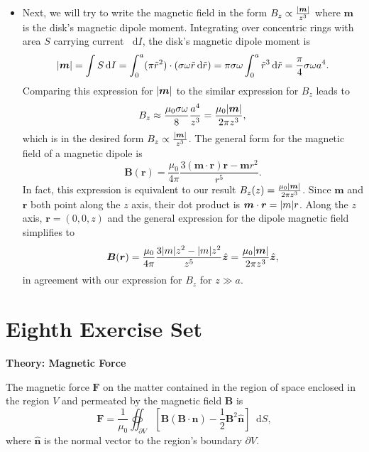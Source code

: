 \documentclass[11pt, a4paper]{article}
\newcommand{\diff}{\mathop{}\!\mathrm{d}} %
\renewcommand{\vec}[1]{\bm{#1}} %
\newcommand{\uvec}[1]{\hat{\vec{#1}}} %
\renewcommand{\t}[1]{\tilde{#1}} %
\renewcommand{\r}{\vec{r}}
\newcommand{\B}{\vec{B}}  %
\newcommand{\m}{\vec{m}}  %
\begin{document}
\begin{itemize}
	\item Next, we will try to write the magnetic field in the form $ B_{z} \propto \frac{\abs{\m}}{z^{3}} $ where $ \m $ is the disk's magnetic dipole moment. Integrating over concentric rings with area $ S $ carrying current $ \diff I $, the disk's magnetic dipole moment is
	\begin{equation*}
		\abs{\m} = \int S \diff I = \int_{0}^{a} (\pi \t{r}^{2}) \cdot (\sigma \omega \t{r}\diff \t{r}) = \pi \sigma \omega \int_{0}^{a} \t{r}^{3} \diff \t{r} = \frac{\pi}{4}\sigma \omega a^{4}.
	\end{equation*}
	Comparing this expression for $ \abs{\m} $ to the similar expression for $ B_{z} $ leads to 
	\begin{equation*}
		B_{z} \approx  \frac{\mu_{0}\sigma \omega}{8} \frac{a^{4}}{z^{3}} = \frac{\mu_{0}\abs{\m}}{2\pi z^{3}},
	\end{equation*}	
	which is in the desired form $  B_{z} \propto \frac{\abs{\m}}{z^{3}} $. The general form for the magnetic field of a magnetic dipole is
	\begin{equation*}
		\B(\r) = \frac{\mu_{0}}{4\pi}\frac{3(\m \cdot \r)\r - \m r^{2}}{r^{5}}.
	\end{equation*}
	In fact, this expression is equivalent to our result $ B_{z}(z) = \frac{\mu_{0}\abs{\m}}{2\pi z^{3}} $. Since $ \m $ and $ \r $ both point along the $ z $ axis, their dot product is $ \m \cdot \r = \abs{m}r $. Along the $ z $ axis, $ \r = (0, 0, z) $ and the general expression for the dipole magnetic field simplifies to
	\begin{equation*}
		\B(\r) = \frac{\mu_{0}}{4\pi} \frac{3\abs{m}z^{2} - \abs{m}z^{2}}{z^{5}}\uvec{z} = \frac{\mu_{0}\abs{\m}}{2\pi z^{3}} \uvec{z},
	\end{equation*}
	in agreement with our expression for $ B_{z} $ for $ z \gg a $.
	
\end{itemize}

\newpage
\section{Eighth Exercise Set}

\textbf{Theory: Magnetic Force}\vspace{2mm}

The magnetic force $ \vec{F} $ on the matter contained in the region of space enclosed in the region $ V $ and permeated by the magnetic field $ \B $ is
\begin{equation*}
	\vec{F} = \frac{1}{\mu_{0}}\oiint_{\partial V}\left [\B(\B \cdot \uvec{n}) - \frac{1}{2}\B^{2}\uvec{n}\right ] \diff S,
\end{equation*}
where $ \uvec{n} $ is the normal vector to the region's boundary $ \partial V $.
\end{document}
